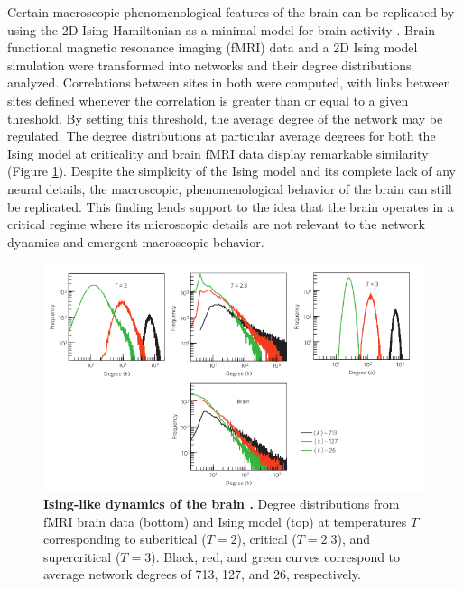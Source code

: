 \documentclass[12pt]{article}
\begin{document}
Certain macroscopic phenomenological features of the brain can be replicated by using the 2D Ising Hamiltonian as a minimal model for brain activity \cite{Fraiman2009a}. Brain functional magnetic resonance imaging (fMRI) data and a 2D Ising model simulation were transformed into networks and their degree distributions analyzed. Correlations between sites in both were computed, with links between sites defined whenever the correlation is greater than or equal to a given threshold. By setting this threshold, the average degree of the network may be regulated. The degree distributions at particular average degrees for both the Ising model at criticality and brain fMRI data display remarkable similarity (Figure \ref{Figure::Ising model and the brain at criticality}). Despite the simplicity of the Ising model and its complete lack of any neural details, the macroscopic, phenomenological behavior of the brain can still be replicated. This finding lends support to the idea that the brain operates in a critical regime where its microscopic details are not relevant to the network dynamics and emergent macroscopic behavior.

\begin{figure}      
  \begin{center}    
 \includegraphics[width=.8\textwidth]{isinglikedynamicschialvo}    
    \caption{\textbf{Ising-like dynamics of the brain \cite{Fraiman2009a}.} Degree distributions from fMRI brain data (bottom) and Ising model (top) at temperatures $T$ corresponding to subcritical ($T=2$), critical ($T=2.3$), and supercritical ($T=3$). Black, red, and green curves correspond to average network degrees of 713, 127, and 26, respectively.}
   \label{Figure::Ising model and the brain at criticality}   
  \end{center}     
   \end{figure}
   
\end{document}
